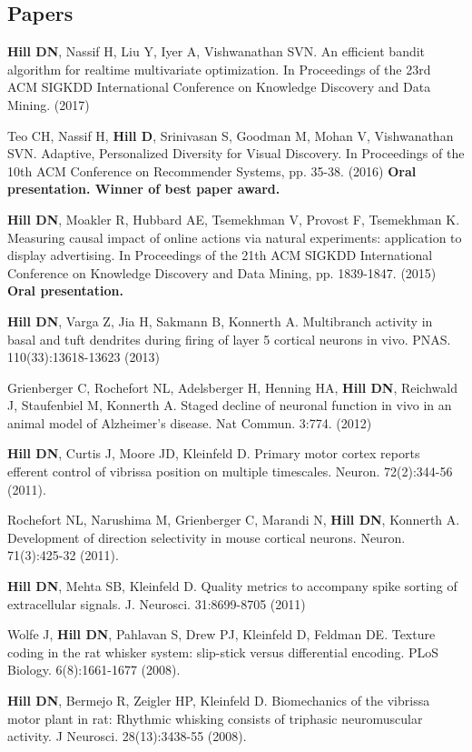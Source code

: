 \documentclass[line,11pt]{res}
\begin{document}
\begin{resume}
\section{Papers}
\vspace{0.1in}
\textbf{Hill DN}, Nassif H, Liu Y, Iyer A, Vishwanathan SVN. An efficient bandit algorithm for realtime multivariate optimization. In Proceedings of the 23rd ACM SIGKDD International Conference on Knowledge Discovery and Data Mining. (2017)

Teo CH, Nassif H, \textbf{Hill D}, Srinivasan S, Goodman M, Mohan V, Vishwanathan SVN. Adaptive, Personalized Diversity for Visual Discovery. In Proceedings of the 10th ACM Conference on Recommender Systems, pp. 35-38. (2016) \textbf{Oral presentation. Winner of best paper award.}

\textbf{Hill DN}, Moakler R, Hubbard AE, Tsemekhman V, Provost F, Tsemekhman K.  Measuring causal impact of online actions via natural experiments: application to display advertising. In Proceedings of the 21th ACM SIGKDD International Conference on Knowledge Discovery and Data Mining, pp. 1839-1847. (2015) \textbf{Oral presentation.}

\textbf{Hill DN}, Varga Z, Jia H, Sakmann B, Konnerth A. Multibranch activity in basal and tuft dendrites during firing of layer 5 cortical neurons in vivo. PNAS. 110(33):13618-13623 (2013)

Grienberger C, Rochefort NL, Adelsberger H, Henning HA, \textbf{Hill DN}, Reichwald J, Staufenbiel M, Konnerth A. Staged decline of neuronal function in vivo in an animal model of Alzheimer's disease. Nat Commun. 3:774. (2012) 

\textbf{Hill DN}, Curtis J, Moore JD, Kleinfeld D.  Primary motor cortex reports efferent control of vibrissa position on multiple timescales. Neuron. 72(2):344-56 (2011).

Rochefort NL, Narushima M, Grienberger C, Marandi N, \textbf{Hill DN}, Konnerth A. Development of direction selectivity in mouse cortical neurons. Neuron. 71(3):425-32 (2011). 

\textbf{Hill DN}, Mehta SB, Kleinfeld D.  Quality metrics to accompany spike sorting of extracellular signals. J. Neurosci. 31:8699-8705 (2011)

Wolfe J, \textbf{Hill DN}, Pahlavan S, Drew PJ, Kleinfeld D, Feldman DE. Texture coding in the rat whisker system: slip-stick versus differential encoding. PLoS Biology. 6(8):1661-1677 (2008). 

\textbf{Hill DN}, Bermejo R, Zeigler HP, Kleinfeld D. Biomechanics of the vibrissa motor plant in rat: Rhythmic whisking consists of triphasic neuromuscular activity. J Neurosci. 28(13):3438-55 (2008). 


\end{resume}
\end{document}
